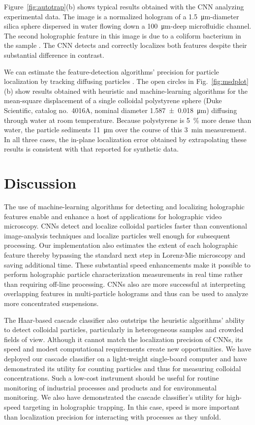 \documentclass[10pt,letterpaper]{article}
\begin{document}
Figure~\ref{fig:autotrap}(b) shows typical results obtained with
the CNN analyzing experimental data.  The image
is a normalized hologram of a
\SI{1.5}{\um}-diameter silica sphere dispersed in water
flowing down a \SI{100}{\um}-deep microfluidic channel.
The second holographic feature in this image is due
to a coliform bacterium in the sample \cite{philips17}.
The CNN detects and correctly localizes
both features despite their substantial
difference in contrast.

We can estimate the feature-detection algorithms' precision
for particle localization by tracking diffusing particles
\cite{crocker96}.
The open circles in Fig.~\ref{fig:msdplot}(b) show results obtained
with heuristic and machine-learning algorithms for the
mean-square displacement of a single colloidal polystyrene sphere
(Duke Scientific, catalog no.\ 4016A, nominal diameter
\SI{1.587+-0.018}{\um}) diffusing through water at
room temperature.
Because polystyrene is \SI{5}{\percent} more dense than water,
the particle sediments \SI{11}{\um} over the course of this
\SI{3}{\minute} measurement.
In all three cases, the in-plane localization error obtained
by extrapolating these results is consistent with that
reported for synthetic data.

\section{Discussion}

The use of machine-learning algorithms for detecting and
localizing holographic features enable and enhance a host of 
applications for holographic video microscopy.
CNNs detect and localize colloidal
particles faster than conventional image-analysis techniques
and localize particles well enough for subsequent processing.
Our implementation also estimates the extent of each holographic feature 
thereby bypassing the standard next step in Lorenz-Mie microscopy
\cite{cheong09} and saving additional time.
These substantial speed enhancements make it possible to
perform holographic particle characterization measurements in real
time rather than requiring off-line processing.
CNNs also are more successful at
interpreting overlapping features in multi-particle
holograms and thus can be used to analyze more concentrated
suspensions.

The Haar-based cascade classifier also outstrips the heuristic algorithms'
ability to detect colloidal particles, particularly in heterogeneous
samples and crowded fields of view.
Although it cannot match the localization precision of CNNs,
its speed and modest computational requirements
create new opportunities.
We have deployed our cascade classifier on a light-weight
single-board computer and have demonstrated its utility for counting particles
and thus for measuring colloidal concentrations.
Such a low-cost instrument should be useful for routine monitoring of
industrial processes and products and for environmental monitoring.
We also have demonstrated the cascade classifier's utility for
high-speed targeting in holographic trapping.  In this case, speed
is more important than localization precision for interacting with
processes as they unfold.
\end{document}
